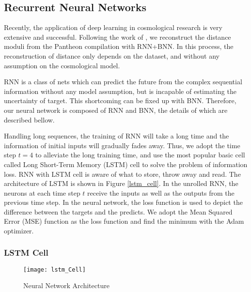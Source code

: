 \subsection{Recurrent Neural Networks}
Recently, the application of deep learning in cosmological research is very extensive and successful. Following the work of \cite{escamilla2020deep}, we reconstruct the distance moduli from the Pantheon compilation \cite{scolnic2018complete} with RNN+BNN. In this process, the reconstruction of distance only depends on the dataset, and without any assumption on the cosmological model.

RNN is a class of nets which can predict the future from the complex sequential information without any model assumption, but is incapable of estimating the uncertainty of target. This shortcoming can be fixed up with BNN. Therefore, our neural network is composed of RNN and BNN, the details of which are described bellow.

Handling long sequences, the training of RNN will take a long time and the information of initial inputs will gradually fades away. Thus, we adopt the time step $t=4$ to alleviate the long training time, and use the most popular basic cell called Long Short-Term Memory (LSTM) cell to solve the problem of information loss. RNN with LSTM cell is aware of what to store, throw away and read. The architecture of LSTM is shown in Figure \eqref{lstm_cell}. In the unrolled RNN, the neurons at each time step $t$ receive the inputs as well as the outputs from the previous time step. In the neural network, the loss function is used to depict the difference between the targets and the predicts. We adopt the Mean Squared Error (MSE) function as the loss function and find the minimum with the Adam optimizer.

\subsubsection{LSTM Cell}
\begin{figure} [H]
	\centering
	\texttt{[image: lstm\_Cell]}
	\caption{Neural Network Architecture}
	\label{lstm_cell}
\end{figure}

